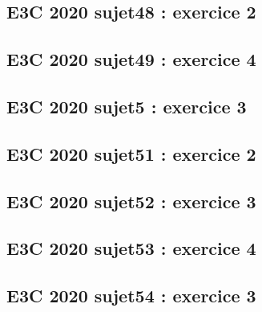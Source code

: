 \documentclass[lang=fr,edition=teacher,layout=sheet]{mxbook}
\begin{document}
\begingroup\endgroup
\par\bigskip
{}\subsection*{E3C 2020 sujet48 : exercice 2}
\begingroup\endgroup
\par\bigskip
{}\subsection*{E3C 2020 sujet49 : exercice 4}
\begingroup\endgroup
\par\bigskip
{}\subsection*{E3C 2020 sujet5 : exercice 3}
\begingroup\endgroup
\par\bigskip
{}\subsection*{E3C 2020 sujet51 : exercice 2}
\begingroup\endgroup
\par\bigskip
{}\subsection*{E3C 2020 sujet52 : exercice 3}
\begingroup\endgroup
\par\bigskip
{}\subsection*{E3C 2020 sujet53 : exercice 4}
\begingroup\endgroup
\par\bigskip
{}\subsection*{E3C 2020 sujet54 : exercice 3}
\begingroup\endgroup
\end{document}
